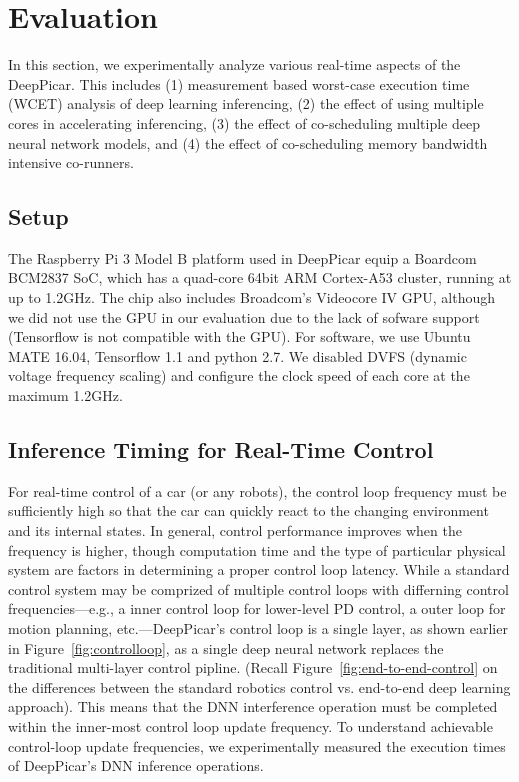 
\section{Evaluation}\label{sec:evaluation}

In this section, we experimentally analyze various real-time aspects
of the DeepPicar. This includes
(1) measurement based worst-case execution time (WCET) analysis of
deep learning inferencing,
(2) the effect of using multiple cores in accelerating inferencing,
(3) the effect of co-scheduling multiple deep neural network models,
and 
(4) the effect of co-scheduling memory bandwidth intensive co-runners.

\subsection{Setup}

The Raspberry Pi 3 Model B platform used in DeepPicar equip a Boardcom
BCM2837 SoC, which has a quad-core 64bit ARM Cortex-A53 cluster,
running at up to 1.2GHz. The chip also includes Broadcom's Videocore IV
GPU, although we did not use the GPU in our evaluation due to the lack
of sofware support (Tensorflow is not compatible with the GPU).
For software, we use Ubuntu MATE 16.04, Tensorflow 1.1 and python
2.7. We disabled DVFS (dynamic voltage frequency scaling) and
configure the clock speed of each core at the maximum 1.2GHz.

\subsection{Inference Timing for Real-Time Control}

For real-time control of a car (or any robots), the control loop
frequency must be sufficiently high so that the car can quickly
react to the changing environment and its internal states. In general,
control performance improves when the frequency is higher, though
computation time and the type of particular physical system are
factors in determining a proper control loop latency. While a standard
control system may be comprized of multiple control loops with
differning control frequencies---e.g., a inner control loop for lower-level
PD control, a outer loop for motion planning, etc.---DeepPicar's
control loop is a single layer, as shown earlier in
Figure~\ref{fig:controlloop}, as a single deep neural network
replaces the traditional multi-layer control pipline. (Recall
Figure~\ref{fig:end-to-end-control} on the differences between the
standard robotics control vs. end-to-end deep learning approach).
This means that the DNN interference operation must be completed
within the inner-most control loop update frequency. To understand
achievable control-loop update frequencies, we experimentally measured
the execution times of DeepPicar's DNN inference operations.

